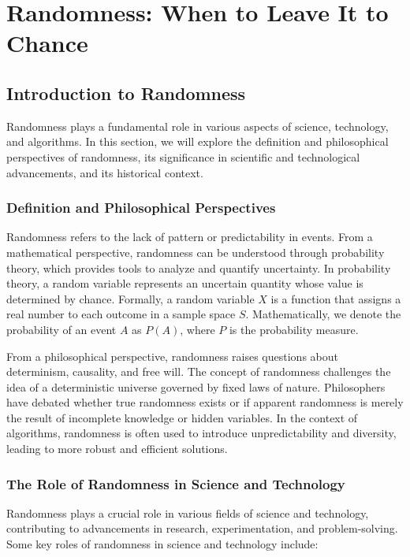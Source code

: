 \documentclass[12pt]{book} %
\begin{document}
\chapter{Randomness: When to Leave It to Chance}

\section{Introduction to Randomness}

Randomness plays a fundamental role in various aspects of science, technology, and algorithms. In this section, we will explore the definition and philosophical perspectives of randomness, its significance in scientific and technological advancements, and its historical context.

\subsection{Definition and Philosophical Perspectives}

Randomness refers to the lack of pattern or predictability in events. From a mathematical perspective, randomness can be understood through probability theory, which provides tools to analyze and quantify uncertainty. In probability theory, a random variable represents an uncertain quantity whose value is determined by chance. Formally, a random variable \(X\) is a function that assigns a real number to each outcome in a sample space \(S\). Mathematically, we denote the probability of an event \(A\) as \(P(A)\), where \(P\) is the probability measure.

From a philosophical perspective, randomness raises questions about determinism, causality, and free will. The concept of randomness challenges the idea of a deterministic universe governed by fixed laws of nature. Philosophers have debated whether true randomness exists or if apparent randomness is merely the result of incomplete knowledge or hidden variables. In the context of algorithms, randomness is often used to introduce unpredictability and diversity, leading to more robust and efficient solutions.

\subsection{The Role of Randomness in Science and Technology}

Randomness plays a crucial role in various fields of science and technology, contributing to advancements in research, experimentation, and problem-solving. Some key roles of randomness in science and technology include:
\end{document}

